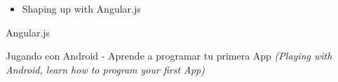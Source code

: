 \documentclass[]{cvStyle1}
\begin{document}
        {
            \vspace{-7mm}
            \begin{itemize}[leftmargin=0cm,label={-}]
            \item Shaping up with Angular.js
            \end{itemize}
        }
        
        {Angular.js}
        
        {Jugando con Android - Aprende a programar tu primera App {\em(Playing with Android, learn how to program your first App)}}
        
\end{document}
